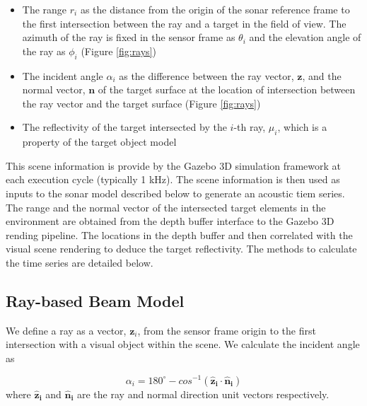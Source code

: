 \documentclass[utf8]{frontiersSCNS} %
\begin{document}
\begin{itemize}
\item  The range $r_i$ as the distance from the origin of the sonar reference frame to the first intersection between the ray and a target in the field of view. The azimuth of the ray is fixed in the sensor frame as $\theta_i$ and the elevation angle of the ray as $\phi_i$ (Figure \ref{fig:rays})

\item  The incident angle $\alpha_i$ as the difference between the ray vector, $\mathbf{z}$, and the normal vector, $\mathbf{n}$ of the target surface at the location of intersection between the ray vector and the target surface (Figure \ref{fig:rays})

\item  The reflectivity of the target intersected by the $i$-th ray, $\mu_i$, which is a property of the target object model

\end{itemize}

This scene information is provide by the Gazebo 3D simulation framework at each execution cycle (typically 1 kHz).  The scene information is then used as inputs to the sonar model described below to generate an acoustic tiem series. The range and the normal vector of the intersected target elements in the environment are obtained from the depth buffer interface to the Gazebo 3D rending pipeline.  The locations in the depth buffer and then correlated with the visual scene rendering to deduce the  target reflectivity. The methods to calculate the time series are detailed below.

\subsection{Ray-based Beam Model}
We define a ray as a vector, $\mathbf{z}_i$, from the sensor frame origin to the first intersection with a visual object within the scene. We calculate the incident angle as

\begin{equation}
    \alpha_i = 180^{\circ} - cos^{-1}(\mathbf{\hat{z}_i} \cdot \mathbf{\hat{n}_i})
\end{equation}
where $\mathbf{\hat{z}_i}$ and $\mathbf{\hat{n}_i}$ are the ray and normal direction unit vectors respectively.
\end{document}

